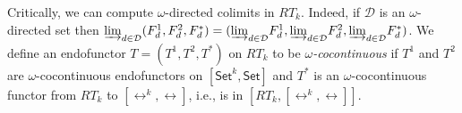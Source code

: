 \documentclass{lmcs}
\theoremstyle{plain}\newtheorem{satz}[thm]{Satz}
\newcommand{\cal}{\mathcal}
\newcommand{\set}{\mathsf{Set}}
\begin{document}
{\vspace*{0.1in}
Critically, we can compute $\omega$-directed colimits in
$RT_k$. Indeed, if $\cal D$ is an $\omega$-directed set then
$\colim{d \in {\cal D}}{(F^1_d, F^2_d,F^*_d)} = (\colim{d \in {\cal
    D}}{F^1_d}, \colim{d \in {\cal D}}{F^2_d}, \colim{d \in {\cal
    D}}{F^*_d})$.  We define an endofunctor $T = (T^1,T^2,T^*)$ on
$RT_k$ to be {\em $\omega$-cocontinuous} if $T^1$ and $T^2$ are
$\omega$-cocontinuous endofunctors on $[\set^k,\set]$ and $T^*$ is an
$\omega$-cocontinuous functor from $RT_k$ to $[\rel^k,\rel]$, i.e., is
in $[RT_k,[\rel^k,\rel]]$.
%
}
\end{document}
